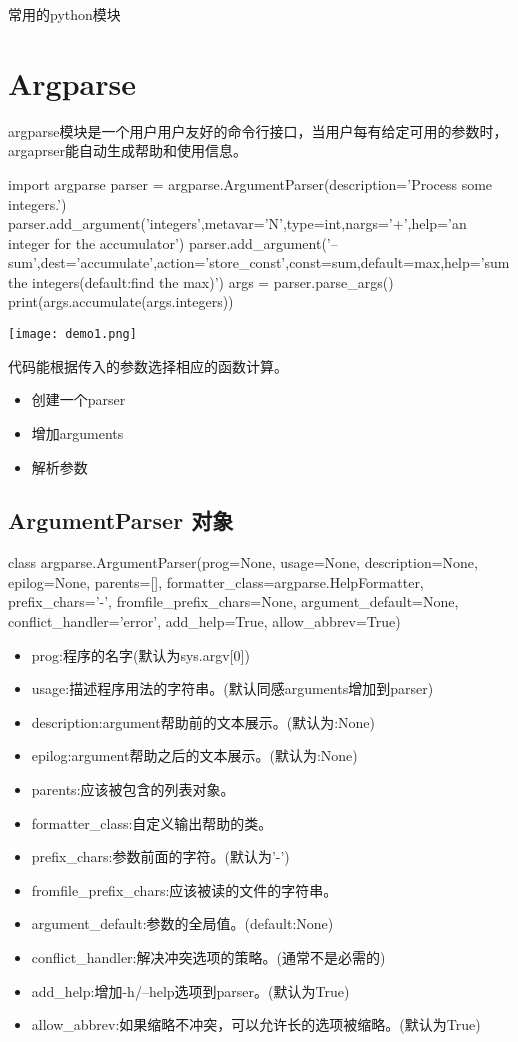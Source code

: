 {常用的python模块}
\section{Argparse}
argparse模块是一个用户用户友好的命令行接口，当用户每有给定可用的参数时，argaprser能自动生成帮助和使用信息。
\begin{python}
import argparse
parser = argparse.ArgumentParser(description='Process some integers.')
parser.add_argument('integers',metavar='N',type=int,nargs='+',help='an integer for the accumulator')
parser.add_argument('--sum',dest='accumulate',action='store_const',const=sum,default=max,help='sum the integers(default:find the max)')
args = parser.parse_args()
print(args.accumulate(args.integers))
\end{python}
\texttt{[image: demo1.png]}\newline

代码能根据传入的参数选择相应的函数计算。
\begin{itemize}
\item 创建一个parser
\item 增加arguments
\item 解析参数
\end{itemize}

\subsection{ArgumentParser 对象}
class argparse.ArgumentParser(prog=None, usage=None, description=None, epilog=None, parents=[], formatter\_class=argparse.HelpFormatter, prefix\_chars='-', fromfile\_prefix\_chars=None, argument\_default=None, conflict\_handler='error', add\_help=True, allow\_abbrev=True)
\begin{itemize}
\item prog:程序的名字(默认为sys.argv[0])
\item usage:描述程序用法的字符串。(默认同感arguments增加到parser)
\item description:argument帮助前的文本展示。(默认为:None)
\item epilog:argument帮助之后的文本展示。(默认为:None)
\item parents:应该被包含的列表对象。
\item formatter\_class:自定义输出帮助的类。
\item prefix\_chars:参数前面的字符。(默认为'-')
\item fromfile\_prefix\_chars:应该被读的文件的字符串。
\item argument\_default:参数的全局值。(default:None)
\item conflict\_handler:解决冲突选项的策略。(通常不是必需的)
\item add\_help:增加-h/--help选项到parser。(默认为True)
\item allow\_abbrev:如果缩略不冲突，可以允许长的选项被缩略。(默认为True)
\end{itemize}
